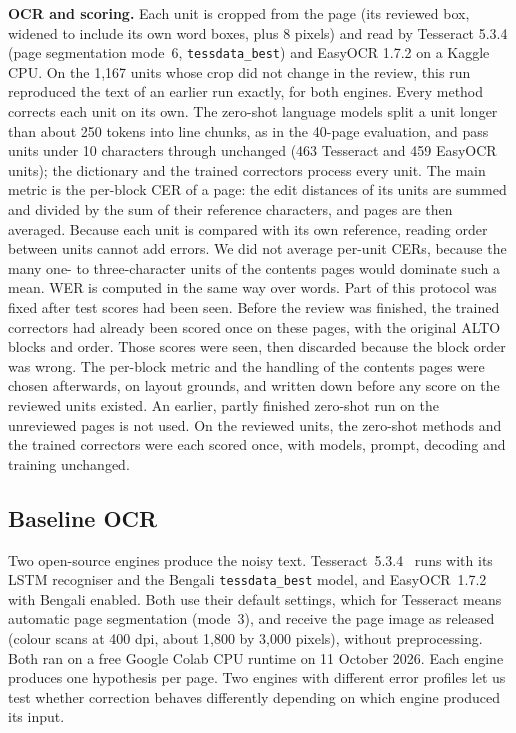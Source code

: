 \documentclass[conference]{IEEEtran}
\begin{document}
\textbf{OCR and scoring.} Each unit is cropped from the page (its reviewed box, widened to include its own word boxes, plus 8 pixels) and read by Tesseract 5.3.4 (page segmentation mode~6, \texttt{tessdata\_best}) and EasyOCR 1.7.2 on a Kaggle CPU. On the 1{,}167 units whose crop did not change in the review, this run reproduced the text of an earlier run exactly, for both engines. Every method corrects each unit on its own. The zero-shot language models split a unit longer than about 250 tokens into line chunks, as in the 40-page evaluation, and pass units under 10 characters through unchanged (463 Tesseract and 459 EasyOCR units); the dictionary and the trained correctors process every unit. The main metric is the per-block CER of a page: the edit distances of its units are summed and divided by the sum of their reference characters, and pages are then averaged. Because each unit is compared with its own reference, reading order between units cannot add errors. We did not average per-unit CERs, because the many one- to three-character units of the contents pages would dominate such a mean. WER is computed in the same way over words. Part of this protocol was fixed after test scores had been seen. Before the review was finished, the trained correctors had already been scored once on these pages, with the original ALTO blocks and order. Those scores were seen, then discarded because the block order was wrong. The per-block metric and the handling of the contents pages were chosen afterwards, on layout grounds, and written down before any score on the reviewed units existed. An earlier, partly finished zero-shot run on the unreviewed pages is not used. On the reviewed units, the zero-shot methods and the trained correctors were each scored once, with models, prompt, decoding and training unchanged.

\subsection{Baseline OCR}
\label{sec:ocr}
Two open-source engines produce the noisy text. Tesseract~5.3.4~\cite{smith2007tesseract,tesseract5} runs with its LSTM recogniser and the Bengali \texttt{tessdata\_best} model, and EasyOCR~1.7.2~\cite{jaidedai2024easyocr} with Bengali enabled. Both use their default settings, which for Tesseract means automatic page segmentation (mode~3), and receive the page image as released (colour scans at 400 dpi, about 1{,}800 by 3{,}000 pixels), without preprocessing. Both ran on a free Google Colab CPU runtime on 11 October 2026. Each engine produces one hypothesis per page. Two engines with different error profiles let us test whether correction behaves differently depending on which engine produced its input.
\end{document}
